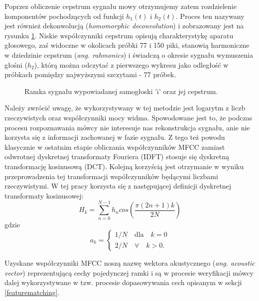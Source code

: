 Poprzez obliczenie cepstrum sygnału mowy otrzymujemy zatem rozdzielenie komponentów pochodzących od funkcji $h_1(t)$ i $h_2(t)$. Proces ten nazywany jest również dekonwolucją (\textit{homomorphic deconvolution})\cite{hdsp} i  zobrazowany jest na rysunku \ref{fig:e_cepstrum}. Niskie współczynniki cepstrum opisują charakterystykę aparatu głosowego, zaś widoczne w okolicach próbki 77 i 150 piki, stanowią harmoniczne w dziedzinie cepstrum (\textit{ang. rahmonics}) i świadczą o okresie sygnału wymuszenia głośni ($h_2$), którą można odczytać z pierwszego wykresu jako odległość w próbkach pomiędzy najwyższymi szczytami - 77 próbek.

\begin{figure}
  \centering
  \begin{minipage}{.5\textwidth}
    \centering
    
  \end{minipage}%
  \begin{minipage}{.5\textwidth}
    \centering
    
  \end{minipage}
  \caption{Ramka sygnału wypowiadanej samogłoski 'i' oraz jej cepstrum.}
  \label{fig:e_cepstrum}
\end{figure}

Należy zwrócić uwagę, że wykorzystywany w tej metodzie jest logarytm z liczb rzeczywistych oraz współczynniki mocy widma. Spowodowane jest to, że podczas procesu rozpoznawania mówcy nie interesuje nas rekonstrukcja sygnału, anie nie korzysta się z informacji zachowanej w fazie sygnału. Z tego też powodu klasycznie w ostatnim etapie obliczania współczynników MFCC zamiast odwrotnej dyskretnej transformaty Fouriera (IDFT) stosuje się dyskretną transformację kosinusową (DCT). Kolejną korzyścią jest otrzymanie w wyniku przeprowadzenia tej transformacji współczynników będącymi liczbami rzeczywistymi. W tej pracy korzysta się z następującej definicji dyskretnej transformaty kosinusowej:
\begin{equation}
  \label{dct}
    H_k = \sum_{n=0}^{N-1} h_ncos\left(\frac{\pi (2n+1)k}{2N}\right)
\end{equation}
gdzie
\begin{equation}
    a_k = 
    \begin{cases}
        1/N \quad \text{dla}\quad k=0 \\
        2/N \quad \forall \quad k>0.
    \end{cases}
\end{equation}

Uzyskane współczynniki MFCC noszą nazwę wektora akustycznego (\textit{ang. acoustic vector}) reprezentującą cechy pojedynczej ramki i są w procesie weryfikacji mówcy dalej wykorzystywane w tzw. procesie dopasowywania cech opisanym w sekcji \ref{featurematching}.

